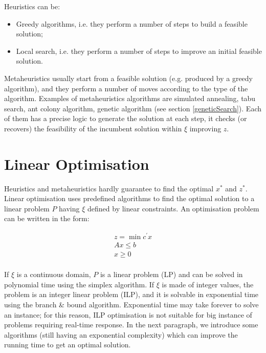 Heuristics can be:

\begin{itemize}
    \item Greedy algorithms, i.e. they perform a number of steps to build a feasible solution;
    \item Local search, i.e. they perform a number of steps to improve an initial feasible solution.
\end{itemize}

Metaheuristics usually start from a feasible solution (e.g. produced by a greedy algorithm), and they perform a number of moves according to the type of the algorithm. Examples of metaheuristics algorithms are simulated annealing, tabu search, ant colony algorithm, genetic algorithm (see section \ref{geneticSearch}). Each of them has a precise logic to generate the solution at each step, it checks (or recovers) the feasibility of the incumbent solution within $\xi$ improving $z$.

\section{Linear Optimisation}

Heuristics and metaheuristics hardly guarantee to find the optimal $x^\ast$ and $z^\ast$. Linear optimisation uses predefined algorithms to find the optimal solution to a linear problem $P$ having $\xi$ defined by linear constraints. An optimisation problem can be written in the form:

\begin{equation}
\begin{split}
    z=\min{c^\prime x} \\
    Ax\le b \\
    x\geq0 \\
\end{split}
\label{eq_linearProblem}
\end{equation}

If $\xi$ is a continuous domain, $P$ is a linear problem (LP) and can be solved in polynomial time using the simplex algorithm. If $\xi$ is made of integer values, the problem is an integer linear problem (ILP), and it is solvable in exponential time using the branch \& bound algorithm. Exponential time may take forever to solve an instance; for this reason, ILP optimisation is not suitable for big instance of problems requiring real-time response. In the next paragraph, we introduce some algorithms (still having an exponential complexity) which can improve the running time to get an optimal solution.

